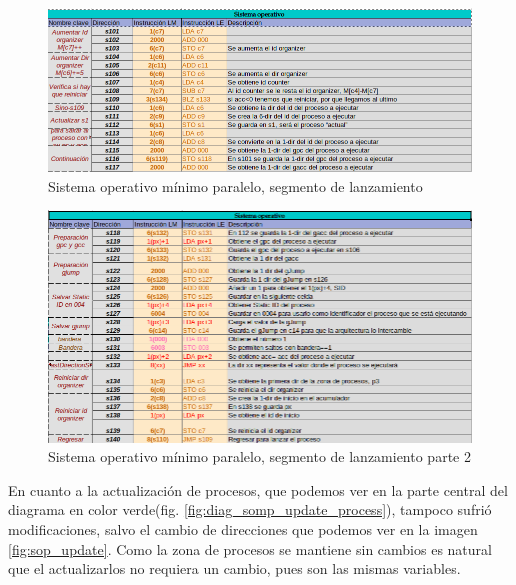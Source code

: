 \documentclass[letterpaper,12pt,oneside]{book}
\begin{document}
			
			\begin{figure}[h]		
				\centering
				\includegraphics[scale=0.53]{media/Paralela/sop_launch1.png}
				\caption{Sistema operativo mínimo paralelo, segmento de lanzamiento}
				\label{fig:sop_launch}
			\end{figure}	
			
			
			\begin{figure}[h]		
				\centering
				\includegraphics[scale=0.5]{media/Paralela/sop_launch2.png}
				\caption{ Sistema operativo mínimo paralelo, segmento de lanzamiento parte 2}
				\label{fig:sop_launch2}
			\end{figure}	


			En cuanto a la actualización de procesos, que podemos ver en la parte central del diagrama en color verde(fig. \ref{fig:diag_somp_update_process}),
			tampoco sufrió modificaciones, salvo el cambio de direcciones que podemos ver en la imagen \ref{fig:sop_update}. Como la zona de procesos
			se mantiene sin cambios es natural que el actualizarlos no requiera un cambio, pues son las mismas variables.
\end{document}
